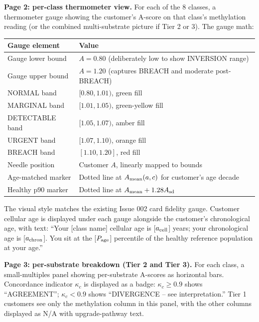 \documentclass[12pt,a4paper]{article}
\begin{document}
\textbf{Page 2: per-class thermometer view.} For each of the 8
classes, a thermometer gauge showing the customer's A-score on that
class's methylation reading (or the combined multi-substrate picture
if Tier 2 or 3). The gauge math:

\begin{center}
\footnotesize
\renewcommand{\arraystretch}{1.1}
\begin{tabular}{ll}
\toprule
Gauge element & Value \\
\midrule
Gauge lower bound & $A = 0.80$ (deliberately low to show INVERSION range) \\
Gauge upper bound & $A = 1.20$ (captures BREACH and moderate post-BREACH) \\
NORMAL band       & $[0.80, 1.01)$, green fill \\
MARGINAL band     & $[1.01, 1.05)$, green-yellow fill \\
DETECTABLE band   & $[1.05, 1.07)$, amber fill \\
URGENT band       & $[1.07, 1.10)$, orange fill \\
BREACH band       & $[1.10, 1.20]$, red fill \\
Needle position   & Customer $A$, linearly mapped to bounds \\
Age-matched marker & Dotted line at $A_{\rm mean}(a,c)$ for customer's age decade \\
Healthy p90 marker & Dotted line at $A_{\rm mean} + 1.28 A_{\rm sd}$ \\
\bottomrule
\end{tabular}
\end{center}

The visual style matches the existing Issue 002 card fidelity gauge.
Customer cellular age is displayed under each gauge alongside the
customer's chronological age, with text: ``Your [class name]
cellular age is [$a_{\rm cell}$] years; your chronological age is
[$a_{\rm chron}$]. You sit at the [$P_{\rm age}$] percentile of the
healthy reference population at your age.''

\textbf{Page 3: per-substrate breakdown (Tier 2 and Tier 3).} For each
class, a small-multiples panel showing per-substrate A-scores as
horizontal bars. Concordance indicator $\kappa_c$ is displayed as a
badge: $\kappa_c \geq 0.9$ shows ``AGREEMENT''; $\kappa_c < 0.9$ shows
``DIVERGENCE -- see interpretation.'' Tier 1 customers see only the
methylation column in this panel, with the other columns displayed
as N/A with upgrade-pathway text.
\end{document}
